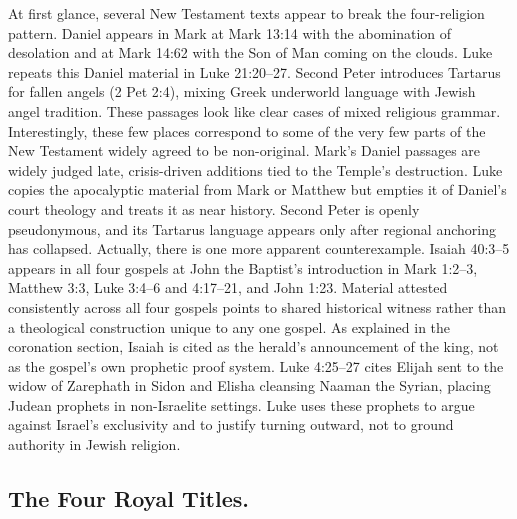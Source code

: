 At first glance, several New Testament texts appear to break the four-religion pattern.
Daniel appears in Mark at Mark 13:14 with the abomination of desolation and at Mark 14:62 with the Son of Man coming on the clouds.
Luke repeats this Daniel material in Luke 21:20--27.
Second Peter introduces Tartarus for fallen angels (2 Pet 2:4), mixing Greek underworld language with Jewish angel tradition.
These passages look like clear cases of mixed religious grammar.
Interestingly, these few places correspond to some of the very few parts of the New Testament widely agreed to be non-original.
Mark's Daniel passages are widely judged late, crisis-driven additions tied to the Temple's destruction.
Luke copies the apocalyptic material from Mark or Matthew but empties it of Daniel's court theology and treats it as near history.
Second Peter is openly pseudonymous, and its Tartarus language appears only after regional anchoring has collapsed.
Actually, there is one more apparent counterexample.
Isaiah 40:3--5 appears in all four gospels at John the Baptist's introduction in Mark 1:2--3, Matthew 3:3, Luke 3:4--6 and 4:17--21, and John 1:23.
Material attested consistently across all four gospels points to shared historical witness rather than a theological construction unique to any one gospel.
As explained in the coronation section, Isaiah is cited as the herald's announcement of the king, not as the gospel's own prophetic proof system.
Luke 4:25--27 cites Elijah sent to the widow of Zarephath in Sidon and Elisha cleansing Naaman the Syrian, placing Judean prophets in non-Israelite settings.
Luke uses these prophets to argue against Israel's exclusivity and to justify turning outward, not to ground authority in Jewish religion.

\subsection{The Four Royal Titles.}

